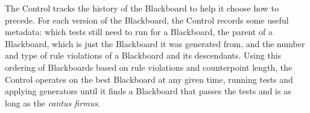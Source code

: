 The Control tracks the history of the Blackboard to help it choose how to precede.
For each version of the Blackboard, the Control records some useful metadata:
  which tests still need to run for a Blackboard,
  the parent of a Blackboard, which is just the Blackboard it was generated from,
  and the number and type of rule violations of a Blackboard and its descendants.
Using this ordering of Blackboards based on rule violations and counterpoint length, 
  the Control operates on the best Blackboard at any given time, 
  running tests and applying generators until it finds a Blackboard that passes the tests and is as long as the \emph{cantus firmus}.

